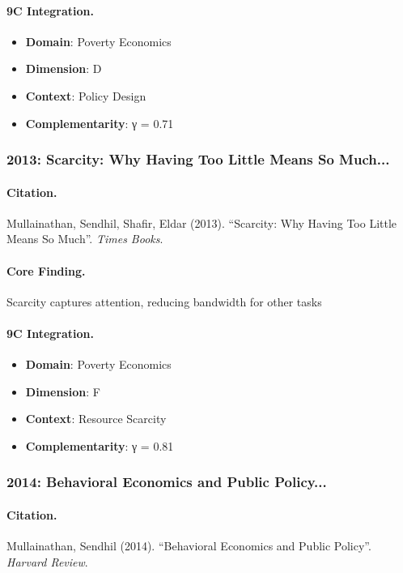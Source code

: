 \paragraph{9C Integration.}
\begin{itemize}[nosep]
  \item \textbf{Domain}: Poverty Economics
  \item \textbf{Dimension}: D
  \item \textbf{Context}: Policy Design
  \item \textbf{Complementarity}: γ = 0.71
\end{itemize}


\subsubsection{2013: Scarcity: Why Having Too Little Means So Much...}

\paragraph{Citation.}
Mullainathan, Sendhil, Shafir, Eldar (2013). ``Scarcity: Why Having Too Little Means So Much''. \textit{Times Books}.

\paragraph{Core Finding.}
Scarcity captures attention, reducing bandwidth for other tasks

\paragraph{9C Integration.}
\begin{itemize}[nosep]
  \item \textbf{Domain}: Poverty Economics
  \item \textbf{Dimension}: F
  \item \textbf{Context}: Resource Scarcity
  \item \textbf{Complementarity}: γ = 0.81
\end{itemize}


\subsubsection{2014: Behavioral Economics and Public Policy...}

\paragraph{Citation.}
Mullainathan, Sendhil (2014). ``Behavioral Economics and Public Policy''. \textit{Harvard Review}.

